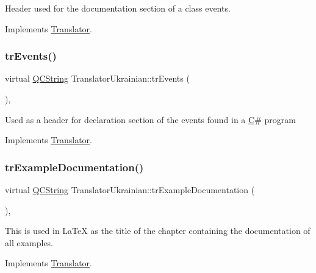 Header used for the documentation section of a class\textquotesingle{} events. 

Implements \mbox{\hyperlink{class_translator}{Translator}}.

\mbox{\label{class_translator_ukrainian_a9ff55cd2b9e1a4efe4ae403efcddfff7}} 
\subsubsection{\texorpdfstring{trEvents()}{trEvents()}}
{\footnotesize\ttfamily virtual \mbox{\hyperlink{class_q_c_string}{Q\+C\+String}} Translator\+Ukrainian\+::tr\+Events (\begin{DoxyParamCaption}{ }\end{DoxyParamCaption})\hspace{0.3cm}{\ttfamily [inline]}, {\ttfamily [virtual]}}

Used as a header for declaration section of the events found in a \mbox{\hyperlink{class_c}{C}}\# program 

Implements \mbox{\hyperlink{class_translator}{Translator}}.

\mbox{\label{class_translator_ukrainian_a7bcf3d7e69a9dfdebe8e8cc7b6e21d21}} 
\subsubsection{\texorpdfstring{trExampleDocumentation()}{trExampleDocumentation()}}
{\footnotesize\ttfamily virtual \mbox{\hyperlink{class_q_c_string}{Q\+C\+String}} Translator\+Ukrainian\+::tr\+Example\+Documentation (\begin{DoxyParamCaption}{ }\end{DoxyParamCaption})\hspace{0.3cm}{\ttfamily [inline]}, {\ttfamily [virtual]}}

This is used in La\+TeX as the title of the chapter containing the documentation of all examples. 

Implements \mbox{\hyperlink{class_translator}{Translator}}.

